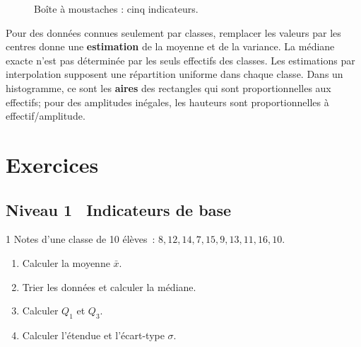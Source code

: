 \begin{figure}[H]
\centering
{}
\caption{Bo\^ite \`a moustaches : cinq indicateurs.}
\end{figure}

\begin{remarque}
Pour des donn\'ees connues seulement par classes, remplacer les valeurs par
les centres donne une \textbf{estimation} de la moyenne et de la variance.
La m\'ediane exacte n'est pas d\'etermin\'ee par les seuls effectifs des classes.
Les estimations par interpolation supposent une r\'epartition uniforme dans
chaque classe. Dans un histogramme, ce sont les \textbf{aires} des rectangles
qui sont proportionnelles aux effectifs; pour des amplitudes in\'egales,
les hauteurs sont proportionnelles \`a effectif/amplitude.
\end{remarque}
\section{Exercices}

\subsection*{\quad Niveau 1 \textemdash\ Indicateurs de base}

\begin{exo}{1}
Notes d'une classe de 10 \'el\`eves~:
$8, 12, 14, 7, 15, 9, 13, 11, 16, 10$.
\begin{enumerate}
  \item Calculer la moyenne $\bar{x}$.
  \item Trier les donn\'ees et calculer la m\'ediane.
  \item Calculer $Q_1$ et $Q_3$.
  \item Calculer l'\'etendue et l'\'ecart-type $\sigma$.
\end{enumerate}
\end{exo}

